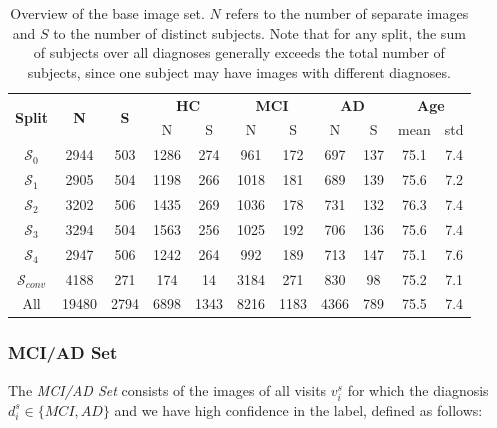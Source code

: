 \begin{table}[h]
	\begin{center}
		\begin{tabular}{c c c c c c c c c c c}
			\toprule
			\multirow{2}{*}{\bfseries Split} & 
			\multirow{2}{*}{\bfseries N} & 
			\multirow{2}{*}{\bfseries S} & 
			\multicolumn{2}{c}{\bfseries HC} & 
			\multicolumn{2}{c}{\bfseries MCI} & 
			\multicolumn{2}{c}{\bfseries AD} &
			\multicolumn{2}{c}{\bfseries Age} \\
			\cmidrule(lr){4-5}
			\cmidrule(lr){6-7}
			\cmidrule(lr){8-9}
			\cmidrule(lr){10-11} 
			& & & N & S & N & S & N & S & mean & std \\ 
			\cmidrule(lr){1-11}
			$\mathcal{S}_0$      &  2944 &  503 & 1286 &  274 &  961 &  172 &  697 & 137 & 75.1 & 7.4 \\
			$\mathcal{S}_1$      &  2905 &  504 & 1198 &  266 & 1018 &  181 &  689 & 139 & 75.6 & 7.2 \\
			$\mathcal{S}_2$      &  3202 &  506 & 1435 &  269 & 1036 &  178 &  731 & 132 & 76.3 & 7.4 \\
			$\mathcal{S}_3$      &  3294 &  504 & 1563 &  256 & 1025 &  192 &  706 & 136 & 75.6 & 7.4 \\
			$\mathcal{S}_4$      &  2947 &  506 & 1242 &  264 &  992 &  189 &  713 & 147 & 75.1 & 7.6 \\
			$\mathcal{S}_{conv}$ &  4188 &  271 &  174 &   14 & 3184 &  271 &  830 &  98 & 75.2 & 7.1 \\
			\cmidrule(lr){1-11}
			All             & 19480 & 2794 & 6898 & 1343 & 8216 & 1183 & 4366 & 789 & 75.5 & 7.4 \\
			\bottomrule
		\end{tabular}
		\caption{Overview of the base image set. $N$ refers to the number of separate images and $S$ to the number of distinct subjects. Note that for any split, the sum of subjects over all diagnoses generally exceeds the total number of subjects, since one subject may have images with different diagnoses.}
		\label{tab:baseset}
	\end{center}
\end{table}

\subsubsection*{MCI/AD Set} \label{sec:datmciad}
The \textit{MCI/AD Set} consists of the images of all visits $v^s_i$ for which the diagnosis $d^s_i \in \{MCI, AD\}$ and we have high confidence in the label, defined as follows:

